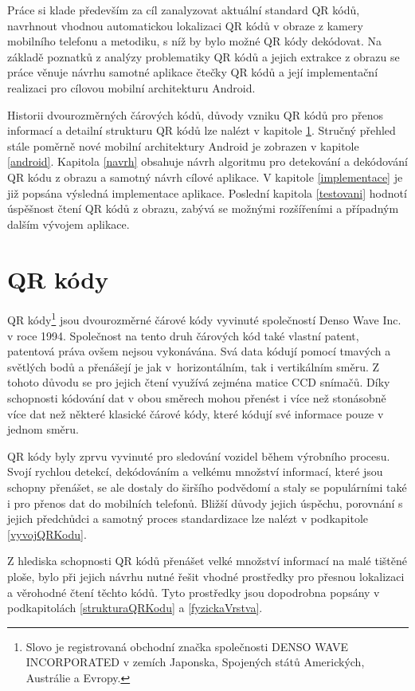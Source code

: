 Práce si klade především za cíl zanalyzovat aktuální standard QR kódů, 
navrhnout vhodnou automatickou lokalizaci QR kódů v obraze z kamery mobilního
telefonu a metodiku, s níž by bylo možné QR kódy dekódovat. Na základě poznatků
z analýzy problematiky QR kódů a jejich extrakce z obrazu se práce věnuje návrhu
samotné aplikace čtečky QR kódů a její implementační realizaci pro cílovou 
mobilní architekturu Android.

Historii dvourozměrných čárových kódů, důvody vzniku QR kódů pro přenos 
informací a detailní strukturu QR kódů lze nalézt v kapitole \ref{QRKody}.
Stručný přehled stále poměrně nové mobilní architektury Android je zobrazen v
kapitole \ref{android}. Kapitola \ref{navrh} obsahuje návrh
algoritmu pro detekování a dekódování QR kódu z obrazu a samotný návrh cílové
aplikace. V kapitole \ref{implementace} je již popsána výsledná implementace
aplikace. Poslední kapitola \ref{testovani} hodnotí úspěšnost čtení QR kódů z
obrazu, zabývá se možnými rozšířeními a případným dalším vývojem aplikace.

\chapter{QR kódy}
\label{QRKody}

QR kódy\footnote{Slovo  je registrovaná obchodní značka
společnosti DENSO WAVE INCORPORATED v zemích Japonska, Spojených států Amerických, Austrálie
a Evropy.} jsou dvourozměrné čárové kódy vyvinuté společností Denso Wave Inc. 
v roce 1994. Společnost na tento druh čárových kód také vlastní patent, 
patentová práva ovšem nejsou vykonávána. Svá data kódují pomocí tmavých a 
světlých bodů a přenášejí je jak v~horizontálním, tak i vertikálním směru. 
Z tohoto důvodu se pro jejich čtení využívá zejména matice CCD snímačů. Díky 
schopnosti kódování dat v obou směrech mohou přenést i více než stonásobně 
více dat než některé klasické čárové kódy, které kódují své informace pouze 
v jednom směru. \cite{aboutQRCOde} 

QR kódy byly zprvu vyvinuté pro sledování vozidel během výrobního procesu. 
Svojí rychlou detekcí, dekódováním a velkému množství informací, které jsou 
schopny přenášet, se ale dostaly do širšího podvědomí a 
staly se populárními také i pro přenos dat do mobilních telefonů. Bližší důvody 
jejich úspěchu, porovnání s jejich předchůdci a samotný proces standardizace 
lze nalézt v podkapitole \ref{vyvojQRKodu}.

Z hlediska schopnosti QR kódů přenášet velké množství informací na malé tištěné 
ploše, bylo při jejich návrhu nutné řešit vhodné prostředky pro přesnou 
lokalizaci a věrohodné čtení těchto kódů. Tyto prostředky jsou dopodrobna 
popsány v podkapitolách \ref{strukturaQRKodu} a \ref{fyzickaVrstva}. 

